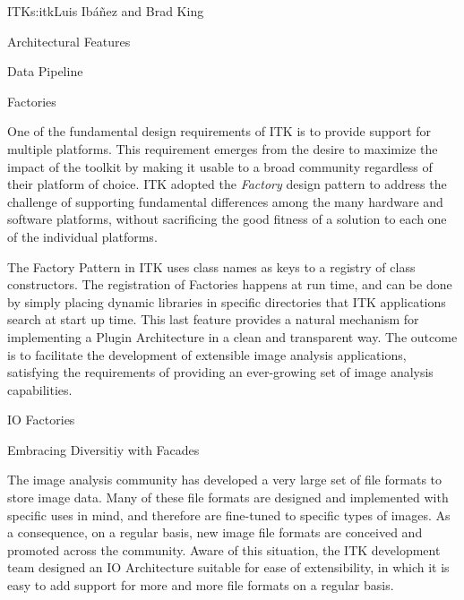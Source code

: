 \begin{aosachapter}{ITK}{s:itk}{Luis Ib\'{a}\~{n}ez and Brad King}
\begin{aosasect1}{Architectural Features}
\begin{aosasect2}{Data Pipeline}
\end{aosasect2}

\begin{aosasect2}{Factories}

One of the fundamental design requirements of ITK is to provide support for
multiple platforms. This requirement emerges from the desire to maximize the
impact of the toolkit by making it usable to a broad community regardless of
their platform of choice. ITK adopted the \emph{Factory} design pattern to
address the challenge of supporting fundamental differences among the many
hardware and software platforms, without sacrificing the good fitness of a
solution to each one of the individual platforms.

The Factory Pattern in ITK uses class names as keys to a registry of class
constructors. The registration of Factories happens at run time, and can be
done by simply placing dynamic libraries in specific directories that ITK
applications search at start up time. This last feature provides a natural
mechanism for implementing a Plugin Architecture in a clean and transparent
way. The outcome is to facilitate the development of extensible image analysis
applications, satisfying the requirements of providing an ever-growing set of
image analysis capabilities.

\end{aosasect2}

\begin{aosasect2}{IO Factories}

\begin{aosasect3}{Embracing Diversitiy with Facades}

The image analysis community has developed a very large set of file formats to
store image data. Many of these file formats are designed and implemented with
specific uses in mind, and therefore are fine-tuned to specific types of
images. As a consequence, on a regular basis, new image file formats are
conceived and promoted across the community. Aware of this situation, the ITK
development team designed an IO Architecture suitable for ease of
extensibility, in which it is easy to add support for more and more file
formats on a regular basis.



\end{aosasect3}
\end{aosasect2}
\end{aosasect1}
\end{aosachapter}
